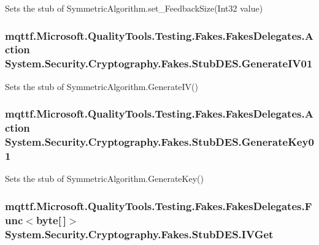 Sets the stub of Symmetric\-Algorithm.\-set\-\_\-\-Feedback\-Size(\-Int32 value)

\hypertarget{class_system_1_1_security_1_1_cryptography_1_1_fakes_1_1_stub_d_e_s_aab0a04028a02fb7e50ed587f7c57ff71}{
\subsubsection[{Generate\-I\-V01}]{\setlength{\rightskip}{0pt plus 5cm}mqttf.\-Microsoft.\-Quality\-Tools.\-Testing.\-Fakes.\-Fakes\-Delegates.\-Action System.\-Security.\-Cryptography.\-Fakes.\-Stub\-D\-E\-S.\-Generate\-I\-V01}}\label{class_system_1_1_security_1_1_cryptography_1_1_fakes_1_1_stub_d_e_s_aab0a04028a02fb7e50ed587f7c57ff71}


Sets the stub of Symmetric\-Algorithm.\-Generate\-I\-V()

\hypertarget{class_system_1_1_security_1_1_cryptography_1_1_fakes_1_1_stub_d_e_s_abf27c1cec8b0d742f00fce7e13a8fc5d}{
\subsubsection[{Generate\-Key01}]{\setlength{\rightskip}{0pt plus 5cm}mqttf.\-Microsoft.\-Quality\-Tools.\-Testing.\-Fakes.\-Fakes\-Delegates.\-Action System.\-Security.\-Cryptography.\-Fakes.\-Stub\-D\-E\-S.\-Generate\-Key01}}\label{class_system_1_1_security_1_1_cryptography_1_1_fakes_1_1_stub_d_e_s_abf27c1cec8b0d742f00fce7e13a8fc5d}


Sets the stub of Symmetric\-Algorithm.\-Generate\-Key()

\hypertarget{class_system_1_1_security_1_1_cryptography_1_1_fakes_1_1_stub_d_e_s_a76b600c51bc9b0657ae716e31dbe4c70}{
\subsubsection[{I\-V\-Get}]{\setlength{\rightskip}{0pt plus 5cm}mqttf.\-Microsoft.\-Quality\-Tools.\-Testing.\-Fakes.\-Fakes\-Delegates.\-Func$<$byte\mbox{[}$\,$\mbox{]}$>$ System.\-Security.\-Cryptography.\-Fakes.\-Stub\-D\-E\-S.\-I\-V\-Get}}\label{class_system_1_1_security_1_1_cryptography_1_1_fakes_1_1_stub_d_e_s_a76b600c51bc9b0657ae716e31dbe4c70}


